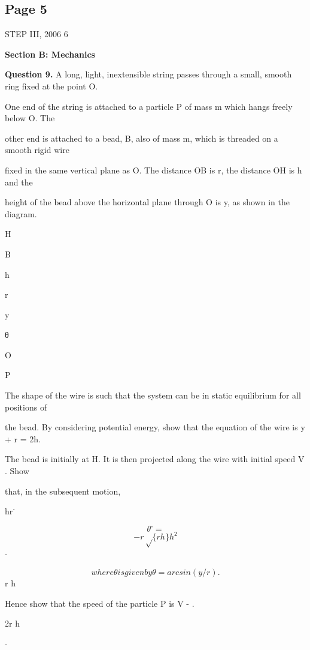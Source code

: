 \documentclass[12pt]{article}
\begin{document}
\subsection*{Page 5}
\begin{flushleft}
STEP III, 2006 6\par
\bigskip\textbf{Section B: Mechanics}\par
\bigskip\textbf{Question 9.} A long, light, inextensible string passes through a small, smooth ring fixed at the point O.\par
One end of the string is attached to a particle P of mass m which hangs freely below O. The\par
other end is attached to a bead, B, also of mass m, which is threaded on a smooth rigid wire\par
fixed in the same vertical plane as O. The distance OB is r, the distance OH is h and the\par
height of the bead above the horizontal plane through O is y, as shown in the diagram.\par
H\par
B\par
h\par
r\par
y\par
θ\par
O\par
P\par
The shape of the wire is such that the system can be in static equilibrium for all positions of\par
the bead. By considering potential energy, show that the equation of the wire is y + r = 2h.\par
The bead is initially at H. It is then projected along the wire with initial speed V . Show\par
that, in the subsequent motion,\par
hr˙\par
\[θ˙ =\]
\[- r\sqrt\{rh\} h^2\]
-\par
\[where θ is given by θ = arcsin(y/r).\]
r h\par
Hence show that the speed of the particle P is V - .\par
2r h\par
\gamma \delta\par
-\par
[Note that arcsin θ is another notation for sin\par
-1\par
θ.]\par
\end{flushleft}
\end{document}
